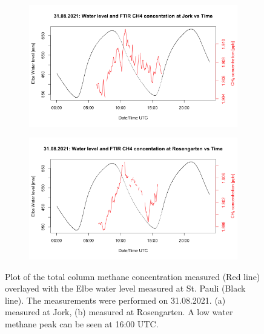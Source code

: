 \begin{figure}[htbp]
\centering
\begin{subfigure}[b]{1\textwidth}
   \includegraphics[width=1\linewidth]{figures/Appendix/FTIR/15_Basic_Plot_CH4_Wl_FTIR202108031mc.png}
   \caption{}
   \label{FTIRWLJork} 
\end{subfigure}
\begin{subfigure}[b]{1\textwidth}
   \includegraphics[width=1\linewidth]{figures/Appendix/FTIR/15_Basic_Plot_CH4_Wl_FTIR202108031md.png}
   \caption{}
   \label{FTIRWLRosengarten}
\end{subfigure}
\caption[FTIR with water level overlay timeline]{Plot of the total column methane concentration measured (Red line) overlayed with the Elbe water level measured at St.
Pauli (Black line). The measurements were performed on 31.08.2021. (a) measured at Jork, (b) measured at Rosengarten. A low water methane peak can be seen at 16:00 UTC.}
\label{FTIRWLAppendix}
\end{figure}